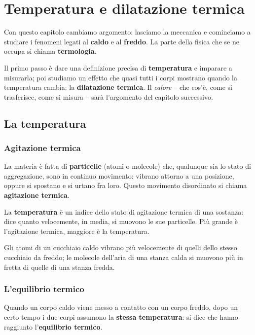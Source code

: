 \chapter{Temperatura e dilatazione termica}

Con questo capitolo cambiamo argomento: lasciamo la meccanica e cominciamo a studiare i fenomeni legati al \textbf{caldo} e al \textbf{freddo}. La parte della fisica che se ne occupa si chiama \textbf{termologia}.

Il primo passo è dare una definizione precisa di \textbf{temperatura} e imparare a misurarla; poi studiamo un effetto che quasi tutti i corpi mostrano quando la temperatura cambia: la \textbf{dilatazione termica}. Il \emph{calore} -- che cos'è, come si trasferisce, come si misura -- sarà l'argomento del capitolo successivo.

\section[La temperatura]{La temperatura}

\subsection{Agitazione termica}
La materia è fatta di \textbf{particelle} (atomi o molecole) che, qualunque sia lo stato di aggregazione, sono in continuo movimento: vibrano attorno a una posizione, oppure si spostano e si urtano fra loro. Questo movimento disordinato si chiama \textbf{agitazione termica}.

\begin{definizione}
La \textbf{temperatura} è un indice dello stato di agitazione termica di una sostanza: dice quanto velocemente, in media, si muovono le sue particelle. Più grande è l'agitazione termica, maggiore è la temperatura.
\end{definizione}

Gli atomi di un cucchiaio caldo vibrano più velocemente di quelli dello stesso cucchiaio da freddo; le molecole dell'aria di una stanza calda si muovono più in fretta di quelle di una stanza fredda.

\subsection{L'equilibrio termico}
Quando un corpo caldo viene messo a contatto con un corpo freddo, dopo un certo tempo i due corpi assumono la \textbf{stessa temperatura}: si dice che hanno raggiunto l'\textbf{equilibrio termico}.

